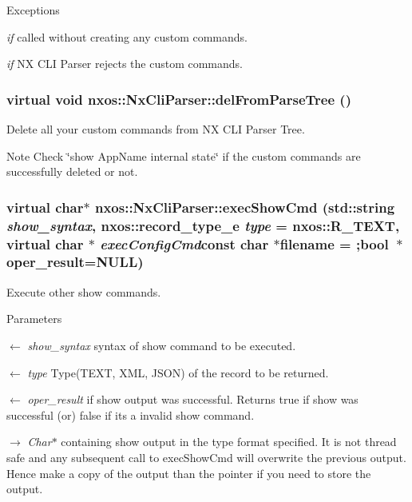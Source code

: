 \begin{DoxyExceptions}{Exceptions}
\item[{\em if}]called without creating any custom commands. \item[{\em if}]NX CLI Parser rejects the custom commands. \end{DoxyExceptions}
\hypertarget{classnxos_1_1NxCliParser_a169976099ecf7a05277bfc72259ff1bc}{
\subsubsection[{delFromParseTree}]{\setlength{\rightskip}{0pt plus 5cm}virtual void nxos::NxCliParser::delFromParseTree ()}}
\label{classnxos_1_1NxCliParser_a169976099ecf7a05277bfc72259ff1bc}
Delete all your custom commands from NX CLI Parser Tree. \begin{DoxyNote}{Note}
Check \char`\"{}show AppName internal state\char`\"{} if the custom commands are successfully deleted or not. 
\end{DoxyNote}
\hypertarget{classnxos_1_1NxCliParser_a074e9c2b831c49885b7d324689442d97}{
\subsubsection[{execShowCmd}]{\setlength{\rightskip}{0pt plus 5cm}virtual char$\ast$ nxos::NxCliParser::execShowCmd (std::string {\em show\_\-syntax}, \/  nxos::record\_\-type\_\-e {\em type} = {\ttfamily nxos::R\_\-TEXT}, \/  virtual char $\ast$ {\em execConfigCmd}const char $\ast$filename = {;bool~$\ast$oper\_\-result=NULL})}}
\label{classnxos_1_1NxCliParser_a074e9c2b831c49885b7d324689442d97}
Execute other show commands. 
\begin{DoxyParams}{Parameters}
\item[\mbox{$\leftarrow$} {\em show\_\-syntax}]syntax of show command to be executed. \item[\mbox{$\leftarrow$} {\em type}]Type(TEXT, XML, JSON) of the record to be returned. \item[\mbox{$\leftarrow$} {\em oper\_\-result}]if show output was successful. Returns true if show was successful (or) false if its a invalid show command. \item[\mbox{$\rightarrow$} {\em Char$\ast$}]containing show output in the type format specified. It is not thread safe and any subsequent call to execShowCmd will overwrite the previous output. Hence make a copy of the output than the pointer if you need to store the output. \end{DoxyParams}

